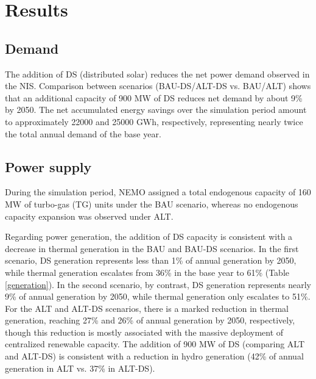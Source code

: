 \documentclass[a4paper,fleqn]{cas-dc}
\begin{document}
\section{Results}

\subsection{Demand}

The addition of DS (distributed solar) reduces the net power demand observed in the NIS. Comparison between scenarios (BAU-DS/ALT-DS vs. BAU/ALT) shows that an additional capacity of 900 MW of DS reduces net demand by about 9\% by 2050. The net accumulated energy savings over the simulation period amount to approximately 22000 and 25000 GWh, respectively, representing nearly twice the total annual demand of the base year.

\subsection{Power supply}

During the simulation period, NEMO assigned a total endogenous capacity of 160 MW of turbo-gas (TG) units under the BAU scenario, whereas no endogenous capacity expansion was observed under ALT.

Regarding power generation, the addition of DS capacity is consistent with a decrease in thermal generation in the BAU and BAU-DS scenarios. In the first scenario, DS generation represents less than 1\% of annual generation by 2050, while thermal generation escalates from 36\% in the base year to 61\% (Table \ref{generation}). In the second scenario, by contrast, DS generation represents nearly 9\% of annual generation by 2050, while thermal generation only escalates to 51\%. For the ALT and ALT-DS scenarios, there is a marked reduction in thermal generation, reaching 27\% and 26\% of annual generation by 2050, respectively, though this reduction is mostly associated with the massive deployment of centralized renewable capacity. The addition of 900 MW of DS (comparing ALT and ALT-DS) is consistent with a reduction in hydro generation (42\% of annual generation in ALT vs. 37\% in ALT-DS).
\end{document}
